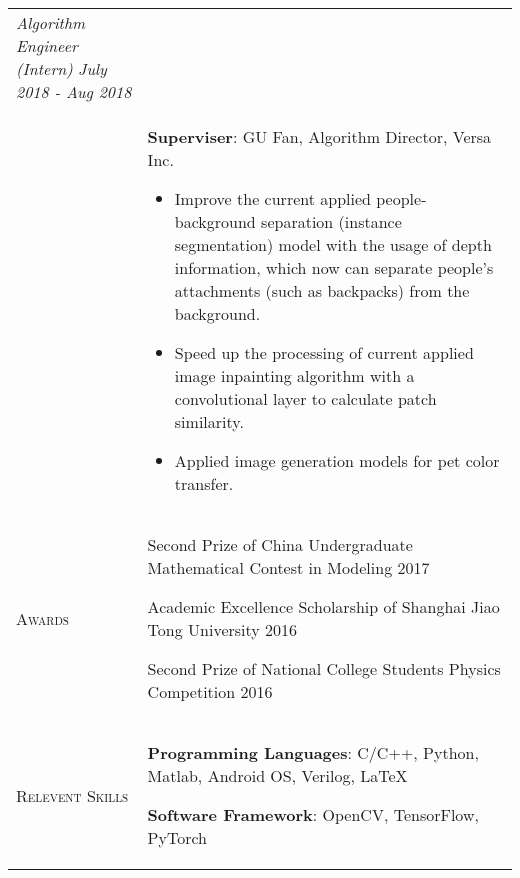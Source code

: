 \documentclass{article}
\begin{document}
\begin{tabular}{p{2.5cm}p{16cm}}
    \textit{Algorithm Engineer (Intern)} \hfill \textit{July 2018 - Aug 2018}\\
    &\textbf{Superviser}: GU Fan, Algorithm Director, Versa Inc.
    \begin{itemize}[leftmargin=1em, topsep=0.5em]
        \setlength{\itemsep}{0pt}
        \setlength{\parsep}{0pt}
        \setlength{\parskip}{0pt}
        \item Improve the current applied people-background separation (instance segmentation) model with the usage of depth information, which now can separate people's attachments (such as backpacks) from the background.
        \item Speed up the processing of current applied image inpainting algorithm with a convolutional layer to calculate patch similarity.
        \item Applied image generation models for pet color transfer.
    \end{itemize}\\
    
    {\textsc{Awards}} & Second Prize of China Undergraduate Mathematical Contest in Modeling \hfill 2017
    
    Academic Excellence Scholarship of Shanghai Jiao Tong University \hfill 2016
    
    Second Prize of National College Students Physics Competition \hfill 2016\vspace{0.4cm}\\
    
    {\textsc{Relevent Skills}} & \textbf{Programming Languages}: C/C++, Python, Matlab, Android OS, Verilog, \LaTeX 
    
    \textbf{Software Framework}: OpenCV, TensorFlow, PyTorch\\
\end{tabular}
\end{document}
